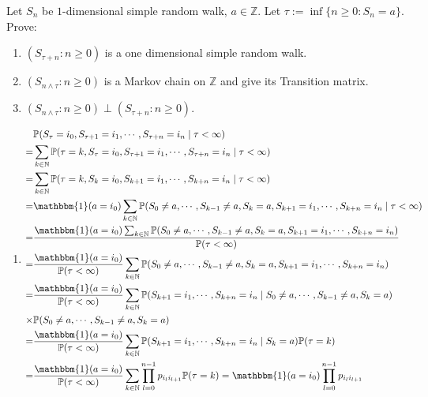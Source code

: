 \documentclass[../main]{subfiles}
\begin{document}
\begin{problem}\label{pro:2}
  Let \(S_n\) be \(1\)-dimensional simple random walk, \(a \in \mathbb{Z}\).
  Let \(\tau := \inf \{n \geq 0: S_n =a\}\).
  Prove:
  \begin{enumerate}
    \item \((S_{\tau + n}:n \geq 0)\) is a one dimensional simple random walk.
    \item \((S_{n \wedge \tau }:n \geq 0)\) is a Markov chain on \(\mathbb{Z}\) and give its
      Transition matrix.
    \item \((S_{n \wedge \tau}:n \geq 0) \perp (S_{\tau + n}: n \geq 0)\).
  \end{enumerate}
\end{problem}
\begin{solution}
  \begin{enumerate}
    \item
      \[
        \begin{aligned}
           & \mathbb{P}(S_\tau=i_0,S_{\tau+1}=i_1,\cdots,S_{\tau+n}=i_n \mid \tau<\infty)
          \\= & \sum_{k \in \mathbb{N}}\mathbb{P}(\tau=k,S_\tau=i_0,S_{\tau+1}=i_1,\cdots,S_{\tau+n}=i_n \mid \tau<\infty)
          \\= & \sum_{k \in \mathbb{N}}\mathbb{P}(\tau=k,S_k=i_0,S_{k+1}=i_1,\cdots,S_{k+n}=i_n \mid \tau<\infty)
          \\= & \mathbbm{1}(a=i_0) \sum_{k \in \mathbb{N}}\mathbb{P}(S_0 \neq a,\cdots,S_{k-1}\neq a,S_k=a,S_{k+1}=i_1,\cdots,S_{k+n}=i_n \mid \tau<\infty)
          \\= & \frac{\mathbbm{1}(a=i_0) \sum_{k \in \mathbb{N}}\mathbb{P}(S_0 \neq a,\cdots,S_{k-1}\neq a,S_k=a,S_{k+1}=i_1,\cdots,S_{k+n}=i_n )}{\mathbb{P}(\tau<\infty)}
          \\= & \frac{\mathbbm{1}(a=i_0)}{\mathbb{P}(\tau<\infty)} \sum_{k \in \mathbb{N}}\mathbb{P}(S_0 \neq a,\cdots,S_{k-1}\neq a,S_k=a,S_{k+1}=i_1,\cdots,S_{k+n}=i_n)
          \\= & \frac{\mathbbm{1}(a=i_0)}{\mathbb{P}(\tau<\infty)} \sum_{k \in \mathbb{N}}\mathbb{P}(S_{k+1}=i_1,\cdots,S_{k+n}=i_n \mid S_0 \neq a,\cdots,S_{k-1}\neq a,S_k=a)
          \\ \times & \mathbb{P}(S_0 \neq a,\cdots,S_{k-1}\neq a,S_k=a)
          \\= & \frac{\mathbbm{1}(a=i_0)}{\mathbb{P}(\tau<\infty)} \sum_{k \in \mathbb{N}}\mathbb{P}(S_{k+1}=i_1,\cdots,S_{k+n}=i_n \mid S_k=a) \mathbb{P}(\tau=k)
          \\= & \frac{\mathbbm{1}(a=i_0)}{\mathbb{P}(\tau<\infty)} \sum_{k \in \mathbb{N}}\prod_{l=0}^{n-1} p_{i_l i_{l+1}} \mathbb{P}(\tau=k)=\mathbbm{1}(a=i_0) \prod_{l=0}^{n-1} p_{i_l i_{l+1}}

\end{aligned}\]
\end{enumerate}
\end{solution}
\end{document}
